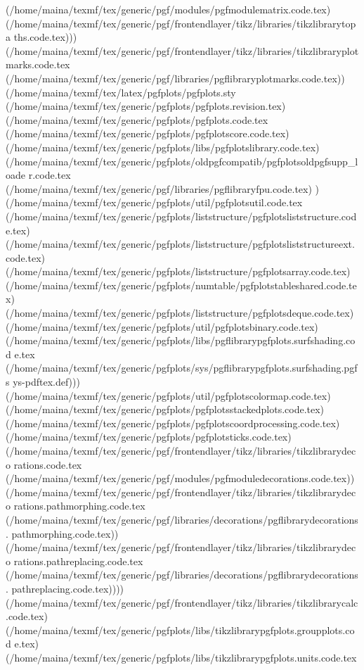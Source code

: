 \begin{center}
\begin{center}
(/home/maina/texmf/tex/generic/pgf/modules/pgfmodulematrix.code.tex)
(/home/maina/texmf/tex/generic/pgf/frontendlayer/tikz/libraries/tikzlibrarytopa
ths.code.tex)))
(/home/maina/texmf/tex/generic/pgf/frontendlayer/tikz/libraries/tikzlibraryplot
marks.code.tex
(/home/maina/texmf/tex/generic/pgf/libraries/pgflibraryplotmarks.code.tex))
(/home/maina/texmf/tex/latex/pgfplots/pgfplots.sty
(/home/maina/texmf/tex/generic/pgfplots/pgfplots.revision.tex)
(/home/maina/texmf/tex/generic/pgfplots/pgfplots.code.tex
(/home/maina/texmf/tex/generic/pgfplots/pgfplotscore.code.tex)
(/home/maina/texmf/tex/generic/pgfplots/libs/pgfplotslibrary.code.tex)
(/home/maina/texmf/tex/generic/pgfplots/oldpgfcompatib/pgfplotsoldpgfsupp_loade
r.code.tex (/home/maina/texmf/tex/generic/pgf/libraries/pgflibraryfpu.code.tex)
) (/home/maina/texmf/tex/generic/pgfplots/util/pgfplotsutil.code.tex
(/home/maina/texmf/tex/generic/pgfplots/liststructure/pgfplotsliststructure.cod
e.tex)
(/home/maina/texmf/tex/generic/pgfplots/liststructure/pgfplotsliststructureext.
code.tex)
(/home/maina/texmf/tex/generic/pgfplots/liststructure/pgfplotsarray.code.tex)
(/home/maina/texmf/tex/generic/pgfplots/numtable/pgfplotstableshared.code.tex)
(/home/maina/texmf/tex/generic/pgfplots/liststructure/pgfplotsdeque.code.tex)
(/home/maina/texmf/tex/generic/pgfplots/util/pgfplotsbinary.code.tex)
(/home/maina/texmf/tex/generic/pgfplots/libs/pgflibrarypgfplots.surfshading.cod
e.tex
(/home/maina/texmf/tex/generic/pgfplots/sys/pgflibrarypgfplots.surfshading.pgfs
ys-pdftex.def)))
(/home/maina/texmf/tex/generic/pgfplots/util/pgfplotscolormap.code.tex)
(/home/maina/texmf/tex/generic/pgfplots/pgfplotsstackedplots.code.tex)
(/home/maina/texmf/tex/generic/pgfplots/pgfplotscoordprocessing.code.tex)
(/home/maina/texmf/tex/generic/pgfplots/pgfplotsticks.code.tex)
(/home/maina/texmf/tex/generic/pgf/frontendlayer/tikz/libraries/tikzlibrarydeco
rations.code.tex
(/home/maina/texmf/tex/generic/pgf/modules/pgfmoduledecorations.code.tex))
(/home/maina/texmf/tex/generic/pgf/frontendlayer/tikz/libraries/tikzlibrarydeco
rations.pathmorphing.code.tex
(/home/maina/texmf/tex/generic/pgf/libraries/decorations/pgflibrarydecorations.
pathmorphing.code.tex))
(/home/maina/texmf/tex/generic/pgf/frontendlayer/tikz/libraries/tikzlibrarydeco
rations.pathreplacing.code.tex
(/home/maina/texmf/tex/generic/pgf/libraries/decorations/pgflibrarydecorations.
pathreplacing.code.tex))))
(/home/maina/texmf/tex/generic/pgf/frontendlayer/tikz/libraries/tikzlibrarycalc
.code.tex)
(/home/maina/texmf/tex/generic/pgfplots/libs/tikzlibrarypgfplots.groupplots.cod
e.tex)
(/home/maina/texmf/tex/generic/pgfplots/libs/tikzlibrarypgfplots.units.code.tex

\end{center}
\end{center}
